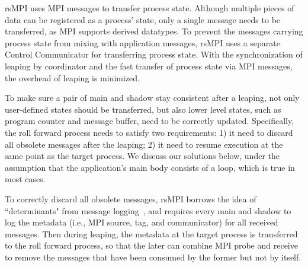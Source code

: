 
rsMPI uses MPI messages to transfer process state. Although multiple pieces of data can be registered as a process' state, only a single message needs to be transferred, as MPI supports derived datatypes. To prevent the messages carrying process state from mixing with application messages, rsMPI uses a separate Control Communicator for transferring process state. With the synchronization of leaping by coordinator and the fast transfer of process state via MPI messages, the overhead of leaping is minimized. 

To make sure a pair of main and shadow stay consistent after a leaping, not only user-defined states should be transferred, but also lower level states, such as program counter and message buffer, need to be correctly updated. Specifically, the roll forward process needs to satisfy two requirements:  
1) it need to discard all obsolete messages after the leaping; 2) it need to resume execution at the same point as the target process. We discuss our solutions below, under the assumption that the application's main body consists of a loop, which is true in most cases. 

To correctly discard all obsolete messages, rsMPI borrows the idea of ``determinants" from message logging~\cite{Elnozahy:02:Survey}, and requires every main and shadow to log the metadata (i.e., MPI source, tag, and communicator) for all received messages. Then during leaping, the metadata at the target process is transferred to the roll forward process, so that the later can combine MPI probe and receive to remove the messages that have been consumed by the former but not by itself.

